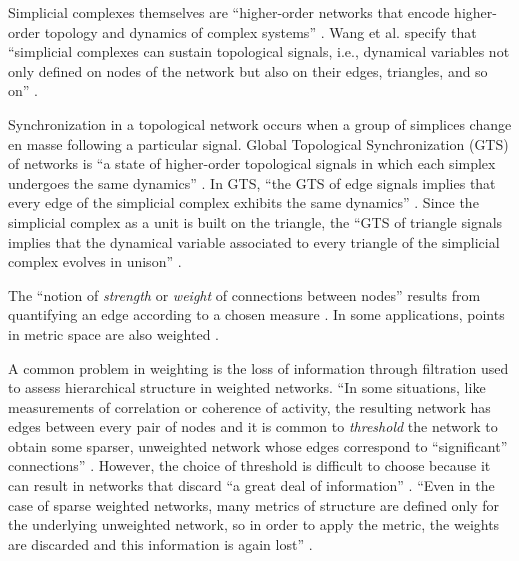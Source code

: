 Simplicial complexes themselves are “higher-order networks that encode higher-order topology and dynamics of complex systems” \citep[p. 1]{wang_global_2024}. Wang et al. specify that “simplicial complexes can sustain topological signals, i.e., dynamical variables not only defined on nodes of the network but also on their edges, triangles, and so on” \citep[p. 1]{wang_global_2024}.

Synchronization in a topological network occurs when a group of simplices change en masse following a particular signal. Global Topological Synchronization (GTS) of networks is “a state of higher-order topological signals in which each simplex undergoes the same dynamics” \citep[p. 1]{wang_global_2024}. In GTS, “the GTS of edge signals implies that every edge of the simplicial complex exhibits the same dynamics” \citep[p. 1]{wang_global_2024}. Since the simplicial complex as a unit is built on the triangle, the “GTS of triangle signals implies that the dynamical variable associated to every triangle of the simplicial complex evolves in unison” \citep[p. 1]{wang_global_2024}.

The “notion of \textit{strength} or \textit{weight} of connections between nodes” \citep[p. 11]{giusti_twos_2016} results from quantifying an edge according to a chosen measure \citep[p. 2]{stolz_persistent_2017}.  In some applications, points in metric space are also weighted \citep[p. 14]{otter_roadmap_2017}.   

A common problem in weighting is the loss of information through filtration used to assess hierarchical structure in weighted networks. “In some situations, like measurements of correlation or coherence of activity, the resulting network has edges between every pair of nodes and it is common to \textit{threshold} the network to obtain some sparser, unweighted network whose edges correspond to “significant” connections” \citep[p. 11]{giusti_twos_2016}. However, the choice of threshold is difficult to choose because it can result in networks that discard “a great deal of information” \citep[p. 11]{giusti_twos_2016}. “Even in the case of sparse weighted networks, many metrics of structure are defined only for the underlying unweighted network, so in order to apply the metric, the weights are discarded and this information is again lost” \citep[p. 11]{giusti_twos_2016}. 

